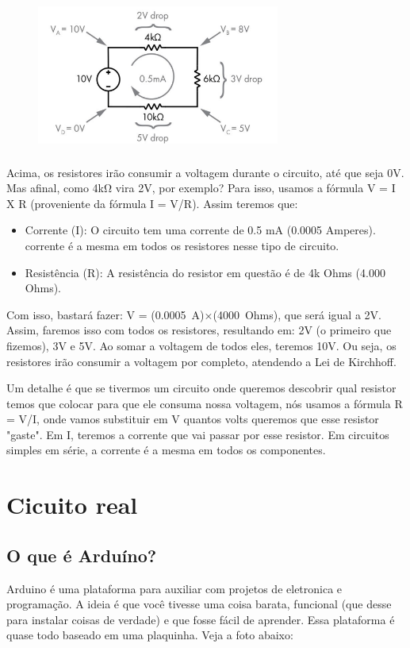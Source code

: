 \documentclass{report}
\begin{document}
	\begin{figure}[ht]
		\centering
		\includegraphics[width=8cm,height=5cm,keepaspectratio=false]{imagens/kirchhoff.png}

	\end{figure}
	
	Acima, os resistores irão consumir a voltagem durante o circuito, até que seja 0V. Mas afinal, como 4kΩ vira 2V, por exemplo? Para isso, usamos a fórmula V = I X R (proveniente da fórmula I = V/R). Assim teremos que:
	\begin{itemize}
		\item Corrente (I): O circuito tem uma corrente de 0.5 mA (0.0005 Amperes). corrente é a mesma em todos os resistores nesse tipo de circuito.
		\item Resistência (R): A resistência do resistor em questão é de 4k Ohms (4.000 Ohms).
	\end{itemize}
	
	Com isso, bastará fazer: V = (0.0005 A)×(4000 Ohms), que será igual a 2V. Assim, faremos isso com todos os resistores, resultando em: 2V (o primeiro que fizemos), 3V e 5V. Ao somar a voltagem de todos eles, teremos 10V. Ou seja, os resistores irão consumir a voltagem por completo, atendendo a Lei de Kirchhoff.
	
	Um detalhe é que se tivermos um circuito onde queremos descobrir qual resistor temos que colocar para que ele consuma nossa voltagem, nós usamos a fórmula R = V/I, onde vamos substituir em V quantos volts queremos que esse resistor "gaste". Em I, teremos a corrente que vai passar por esse resistor. Em circuitos simples em série, a corrente é a mesma em todos os componentes. 
	
	\chapter{Cicuito real}
	\section{O que é Arduíno?}
	Arduino é uma plataforma para auxiliar com projetos de eletronica e programação. A ideia é que você tivesse uma coisa barata, funcional (que desse para instalar coisas de verdade) e que fosse fácil de aprender. Essa plataforma é quase todo baseado em uma plaquinha. Veja a foto abaixo:
	
\end{document}
